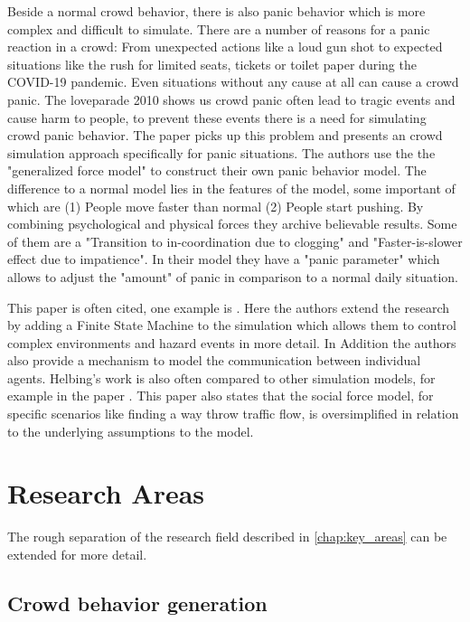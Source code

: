 \documentclass{acmsiggraph}               %
\begin{document}
Beside a normal crowd behavior, there is also panic behavior which is more complex and difficult to simulate. There are a number of reasons for a panic reaction in a crowd: From unexpected actions like a loud gun shot to expected situations like the rush for limited seats, tickets or toilet paper during the COVID-19 pandemic. Even situations without any cause at all can cause a crowd panic. The loveparade 2010 shows us crowd panic often lead to tragic events and cause harm to people, to prevent these events there is a need for simulating crowd panic behavior. 
The paper \cite{helbing_simulating_2000} picks up this problem and presents an crowd simulation approach specifically for panic situations. The authors use the the "generalized force model" \cite{hindsley_investigation_1986} to construct their own panic behavior model. The difference to a normal model lies in the features of the model, some important of which are (1) People move faster than normal (2) People start pushing. By combining psychological and physical forces they archive believable results. Some of them are a "Transition to in-coordination due to clogging" and "Faster-is-slower effect due to impatience". 
In their model they have a "panic parameter" \label{term:panicParameter} which allows to adjust the "amount" of panic in comparison to a normal daily situation. 

This paper is often cited, one example is \cite{braun_simulating_2005}\label{exp:braun2005}. Here the authors extend the research by adding a Finite State Machine to the simulation which allows them to control complex environments and hazard events in more detail. In Addition the authors also provide a mechanism to model the communication between individual agents. Helbing's work is also often compared to other simulation models, for example in the paper \cite{zheng_modeling_2009}. This paper also states that the social force model, for specific scenarios like finding a way throw traffic flow, is oversimplified in relation to the underlying assumptions to the model.

\section{Research Areas}

The rough separation of the research field described in \ref{chap:key_areas} can be extended for more detail.

\subsection{Crowd behavior generation}
\end{document}
